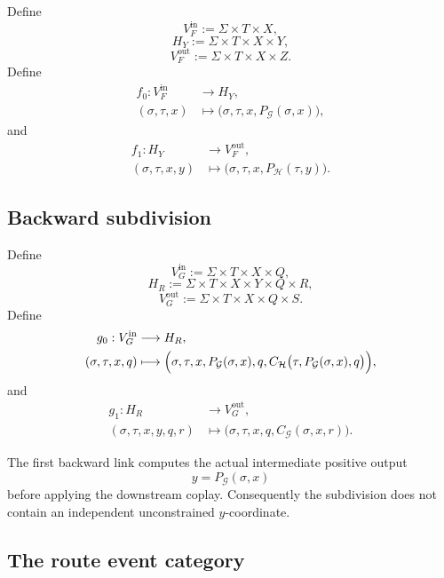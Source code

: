 Define
\[
  V_F^{\mathrm{in}}
  :=
  \Sigma\times T\times X,
\]
\[
  H_Y
  :=
  \Sigma\times T\times X\times Y,
\]
\[
  V_F^{\mathrm{out}}
  :=
  \Sigma\times T\times X\times Z.
\]
Define
\[
\begin{aligned}
  f_0:
  V_F^{\mathrm{in}}
  &\longrightarrow
  H_Y,
  \\
  (\sigma,\tau,x)
  &\longmapsto
  \bigl(
    \sigma,\tau,x,
    P_{\mathcal G}(\sigma,x)
  \bigr),
\end{aligned}
\]
and
\[
\begin{aligned}
  f_1:
  H_Y
  &\longrightarrow
  V_F^{\mathrm{out}},
  \\
  (\sigma,\tau,x,y)
  &\longmapsto
  \bigl(
    \sigma,\tau,x,
    P_{\mathcal H}(\tau,y)
  \bigr).
\end{aligned}
\]

\subsection{Backward subdivision}

Define
\[
  V_G^{\mathrm{in}}
  :=
  \Sigma\times T\times X\times Q,
\]
\[
  H_R
  :=
  \Sigma\times T\times X\times Y\times Q\times R,
\]
\[
  V_G^{\mathrm{out}}
  :=
  \Sigma\times T\times X\times Q\times S.
\]
Define
\[
\begin{aligned}
  g_0:
  V_G^{\mathrm{in}}
  &\longrightarrow
  H_R,
  \\
  (\sigma,\tau,x,q)
  &\longmapsto
  \Bigl(
    \sigma,
    \tau,
    x,
    P_{\mathcal G}(\sigma,x),
    q,
    C_{\mathcal H}
    \bigl(
      \tau,
      P_{\mathcal G}(\sigma,x),
      q
    \bigr)
  \Bigr),
\end{aligned}
\]
and
\[
\begin{aligned}
  g_1:
  H_R
  &\longrightarrow
  V_G^{\mathrm{out}},
  \\
  (\sigma,\tau,x,y,q,r)
  &\longmapsto
  \bigl(
    \sigma,
    \tau,
    x,
    q,
    C_{\mathcal G}(\sigma,x,r)
  \bigr).
\end{aligned}
\]

The first backward link computes the actual intermediate positive output
\[
  y=P_{\mathcal G}(\sigma,x)
\]
before applying the downstream coplay. Consequently the subdivision does not contain an independent
unconstrained \(y\)-coordinate.

\subsection{The route event category}

